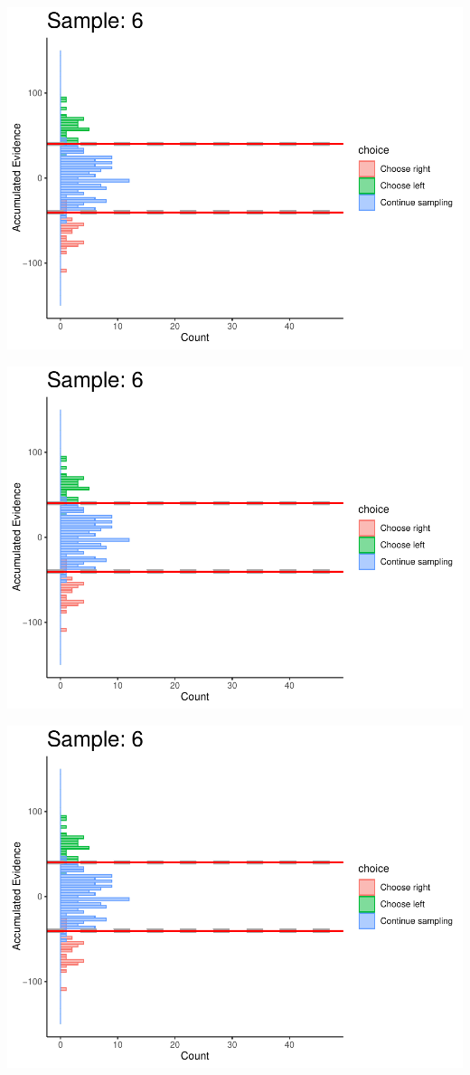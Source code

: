 \documentclass[
]{book}
\begin{document}
\begin{center}\includegraphics[width=0.8\linewidth]{LateNightBayes_files/figure-latex/collapsing_dcb-53} \end{center}

\begin{center}\includegraphics[width=0.8\linewidth]{LateNightBayes_files/figure-latex/collapsing_dcb-54} \end{center}

\begin{center}\includegraphics[width=0.8\linewidth]{LateNightBayes_files/figure-latex/collapsing_dcb-55} \end{center}
\end{document}
